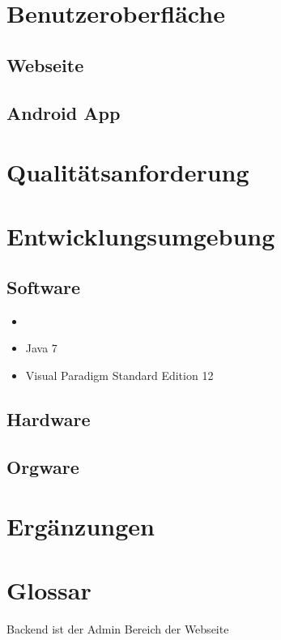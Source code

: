 \documentclass[10pt,a4paper]{article}
\begin{document}
\section{Benutzeroberfl\"ache}
\subsection{Webseite}
\subsection{Android App}
\section{Qualit\"atsanforderung}

\section{Entwicklungsumgebung}
\subsection{Software}
\begin{itemize}
	\item 
	\item Java 7
	\item Visual Paradigm Standard Edition 12
\end{itemize}
\subsection{Hardware}
\subsection{Orgware}
\section{Erg\"anzungen}

\section{Glossar}

Backend ist der Admin Bereich der Webseite
\end{document}

